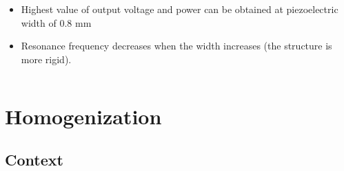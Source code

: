 \documentclass[compress]{beamer}
\begin{document}
\begin{frame}
{\begin{columns}[totalwidth=\textwidth]
\begin{column}{.49\textwidth}
   \begin{exampleblock}{}
   \begin{itemize}[label=$\bullet$, font=\small, leftmargin=*]
	\item Highest value of output voltage and power can be obtained at piezoelectric width of 0.8 mm
	\item Resonance frequency decreases when the width increases (the structure is more rigid).
	\end{itemize}
	\end{exampleblock}
   \end{column}
\end{columns}
}
\end{frame}

\section{Homogenization}
\subsection{Context}
\end{document}
